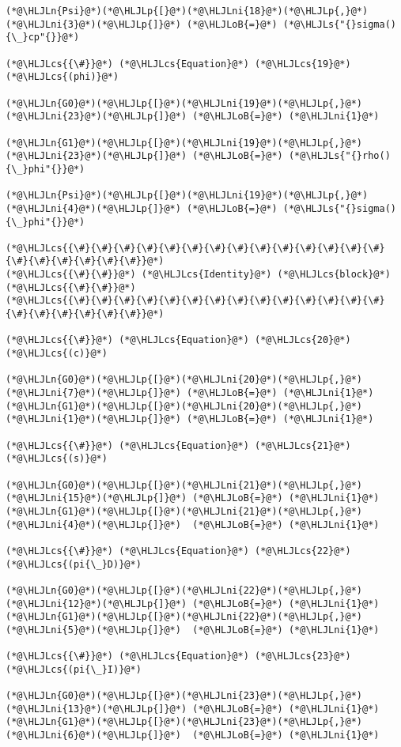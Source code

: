 \documentclass[12pt,a4paper]{article}
\newcommand{\HLJLn}[1]{#1}
\newcommand{\HLJLs}[1]{\textcolor[RGB]{201,61,57}{#1}}
\newcommand{\HLJLni}[1]{\textcolor[RGB]{59,151,46}{#1}}
\newcommand{\HLJLoB}[1]{\textcolor[RGB]{102,102,102}{\textbf{#1}}}
\newcommand{\HLJLp}[1]{#1}
\newcommand{\HLJLcs}[1]{\textcolor[RGB]{153,153,119}{\textit{#1}}}
\begin{document}
\begin{lstlisting}
(*@\HLJLn{Psi}@*)(*@\HLJLp{[}@*)(*@\HLJLni{18}@*)(*@\HLJLp{,}@*)(*@\HLJLni{3}@*)(*@\HLJLp{]}@*) (*@\HLJLoB{=}@*) (*@\HLJLs{"{}sigma(){\_}cp"{}}@*)

(*@\HLJLcs{{\#}}@*) (*@\HLJLcs{Equation}@*) (*@\HLJLcs{19}@*) (*@\HLJLcs{(phi)}@*)

(*@\HLJLn{G0}@*)(*@\HLJLp{[}@*)(*@\HLJLni{19}@*)(*@\HLJLp{,}@*)(*@\HLJLni{23}@*)(*@\HLJLp{]}@*) (*@\HLJLoB{=}@*) (*@\HLJLni{1}@*)

(*@\HLJLn{G1}@*)(*@\HLJLp{[}@*)(*@\HLJLni{19}@*)(*@\HLJLp{,}@*)(*@\HLJLni{23}@*)(*@\HLJLp{]}@*) (*@\HLJLoB{=}@*) (*@\HLJLs{"{}rho(){\_}phi"{}}@*)

(*@\HLJLn{Psi}@*)(*@\HLJLp{[}@*)(*@\HLJLni{19}@*)(*@\HLJLp{,}@*)(*@\HLJLni{4}@*)(*@\HLJLp{]}@*) (*@\HLJLoB{=}@*) (*@\HLJLs{"{}sigma(){\_}phi"{}}@*)

(*@\HLJLcs{{\#}{\#}{\#}{\#}{\#}{\#}{\#}{\#}{\#}{\#}{\#}{\#}{\#}{\#}{\#}{\#}{\#}{\#}{\#}{\#}}@*)
(*@\HLJLcs{{\#}{\#}}@*) (*@\HLJLcs{Identity}@*) (*@\HLJLcs{block}@*) (*@\HLJLcs{{\#}{\#}}@*)
(*@\HLJLcs{{\#}{\#}{\#}{\#}{\#}{\#}{\#}{\#}{\#}{\#}{\#}{\#}{\#}{\#}{\#}{\#}{\#}{\#}{\#}{\#}}@*)

(*@\HLJLcs{{\#}}@*) (*@\HLJLcs{Equation}@*) (*@\HLJLcs{20}@*) (*@\HLJLcs{(c)}@*)

(*@\HLJLn{G0}@*)(*@\HLJLp{[}@*)(*@\HLJLni{20}@*)(*@\HLJLp{,}@*)(*@\HLJLni{7}@*)(*@\HLJLp{]}@*) (*@\HLJLoB{=}@*) (*@\HLJLni{1}@*)
(*@\HLJLn{G1}@*)(*@\HLJLp{[}@*)(*@\HLJLni{20}@*)(*@\HLJLp{,}@*)(*@\HLJLni{1}@*)(*@\HLJLp{]}@*) (*@\HLJLoB{=}@*) (*@\HLJLni{1}@*)

(*@\HLJLcs{{\#}}@*) (*@\HLJLcs{Equation}@*) (*@\HLJLcs{21}@*) (*@\HLJLcs{(s)}@*)

(*@\HLJLn{G0}@*)(*@\HLJLp{[}@*)(*@\HLJLni{21}@*)(*@\HLJLp{,}@*)(*@\HLJLni{15}@*)(*@\HLJLp{]}@*) (*@\HLJLoB{=}@*) (*@\HLJLni{1}@*)
(*@\HLJLn{G1}@*)(*@\HLJLp{[}@*)(*@\HLJLni{21}@*)(*@\HLJLp{,}@*)(*@\HLJLni{4}@*)(*@\HLJLp{]}@*)  (*@\HLJLoB{=}@*) (*@\HLJLni{1}@*)

(*@\HLJLcs{{\#}}@*) (*@\HLJLcs{Equation}@*) (*@\HLJLcs{22}@*) (*@\HLJLcs{(pi{\_}D)}@*)

(*@\HLJLn{G0}@*)(*@\HLJLp{[}@*)(*@\HLJLni{22}@*)(*@\HLJLp{,}@*)(*@\HLJLni{12}@*)(*@\HLJLp{]}@*) (*@\HLJLoB{=}@*) (*@\HLJLni{1}@*)
(*@\HLJLn{G1}@*)(*@\HLJLp{[}@*)(*@\HLJLni{22}@*)(*@\HLJLp{,}@*)(*@\HLJLni{5}@*)(*@\HLJLp{]}@*)  (*@\HLJLoB{=}@*) (*@\HLJLni{1}@*)

(*@\HLJLcs{{\#}}@*) (*@\HLJLcs{Equation}@*) (*@\HLJLcs{23}@*) (*@\HLJLcs{(pi{\_}I)}@*)

(*@\HLJLn{G0}@*)(*@\HLJLp{[}@*)(*@\HLJLni{23}@*)(*@\HLJLp{,}@*)(*@\HLJLni{13}@*)(*@\HLJLp{]}@*) (*@\HLJLoB{=}@*) (*@\HLJLni{1}@*)
(*@\HLJLn{G1}@*)(*@\HLJLp{[}@*)(*@\HLJLni{23}@*)(*@\HLJLp{,}@*)(*@\HLJLni{6}@*)(*@\HLJLp{]}@*)  (*@\HLJLoB{=}@*) (*@\HLJLni{1}@*)


\end{lstlisting}
\end{document}
